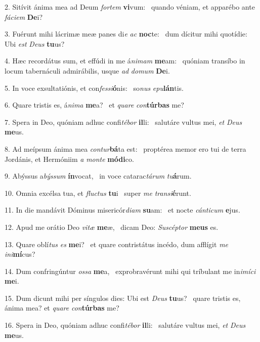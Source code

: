 2. Sitívit ánima mea ad Deum \textit{for}\textit{tem} \textbf{vi}vum: \ast\  quando véniam, et apparébo ante \textit{fá}\textit{ci}\textit{em} \textbf{De}i?\

3. Fuérunt mihi lácrimæ meæ panes di\textit{e} \textit{ac} \textbf{noc}te: \ast\  dum dícitur mihi quotídie: Ubi \textit{est} \textit{De}\textit{us} \textbf{tu}us?\

4. Hæc recordátus sum, et effúdi in me á\textit{ni}\textit{mam} \textbf{me}am: \ast\  quóniam transíbo in locum tabernáculi admirábilis, usque \textit{ad} \textit{do}\textit{mum} \textbf{De}i.\

5. In voce exsultatiónis, et con\textit{fes}\textit{si}\textbf{ó}nis: \ast\  so\textit{nus} \textit{e}\textit{pu}\textbf{lán}tis.\

6. Quare tristis es, á\textit{ni}\textit{ma} \textbf{me}a? \ast\  et \textit{qua}\textit{re} \textit{con}\textbf{túr}\textbf{bas} me?\

7. Spera in Deo, quóniam adhuc confi\textit{té}\textit{bor} \textbf{il}li: \ast\  salutáre vultus mei, \textit{et} \textit{De}\textit{us} \textbf{me}us.\

8. Ad meípsum ánima mea \textit{con}\textit{tur}\textbf{bá}ta est: \ast\  proptérea memor ero tui de terra Jordánis, et Hermóniim \textit{a} \textit{mon}\textit{te} \textbf{mó}\textbf{di}co.\

9. Abýssus a\textit{býs}\textit{sum} \textbf{ín}vocat, \ast\  in voce catarac\textit{tá}\textit{rum} \textit{tu}\textbf{á}rum.\

10. Omnia excélsa tua, et \textit{fluc}\textit{tus} \textbf{tu}i \ast\  super \textit{me} \textit{trans}\textit{i}\textbf{é}runt.\

11. In die mandávit Dóminus misericór\textit{di}\textit{am} \textbf{su}am: \ast\  et nocte \textit{cán}\textit{ti}\textit{cum} \textbf{e}jus.\

12. Apud me orátio Deo \textit{vi}\textit{tæ} \textbf{me}æ, \ast\  dicam Deo: \textit{Su}\textit{scép}\textit{tor} \textbf{me}\textbf{us} es.\

13. Quare oblí\textit{tus} \textit{es} \textbf{me}i? \ast\  et quare contristátus incédo, dum afflígit \textit{me} \textit{in}\textit{i}\textbf{mí}cus?\

14. Dum confringúntur \textit{os}\textit{sa} \textbf{me}a, \ast\  exprobravérunt mihi qui tríbulant me in\textit{i}\textit{mí}\textit{ci} \textbf{me}i.\

15. Dum dicunt mihi per síngulos dies: Ubi est \textit{De}\textit{us} \textbf{tu}us? \ast\  quare tristis es, ánima mea? et \textit{qua}\textit{re} \textit{con}\textbf{túr}\textbf{bas} me?\

16. Spera in Deo, quóniam adhuc confi\textit{té}\textit{bor} \textbf{il}li: \ast\  salutáre vultus mei, \textit{et} \textit{De}\textit{us} \textbf{me}us.\

